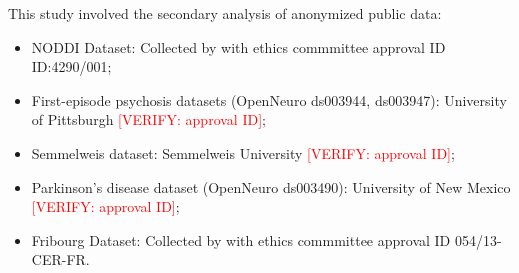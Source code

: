 \documentclass{article}
\newcommand{\verify}[1]{\textcolor{red}{[VERIFY: #1]}}
\begin{document}
This study involved the secondary analysis of anonymized public data:
\begin{itemize}
    \item NODDI Dataset: Collected by \citet{dataset_01} with ethics commmittee approval ID ID:4290/001;
    \item First-episode psychosis datasets (OpenNeuro ds003944, ds003947): University of Pittsburgh \verify{approval ID};
    \item Semmelweis dataset: Semmelweis University \cite{racz2025} \verify{approval ID};
    \item Parkinson's disease dataset (OpenNeuro ds003490): University of New Mexico \verify{approval ID};
    \item Fribourg Dataset: Collected by \citet{dataset2022fribourg} with ethics commmittee approval ID 054/13-CER-FR.
\end{itemize}
\end{document}
